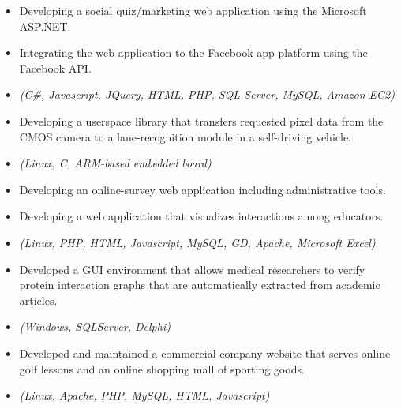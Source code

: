 \begin{itemize}
     \item{Developing a social quiz/marketing web application using the Microsoft ASP.NET.}
     \item{Integrating the web application to the Facebook app platform using the Facebook API.}
     \item{\it\small(C\#, Javascript, JQuery, HTML, PHP, SQL Server, MySQL, Amazon EC2)}
\end{itemize}

\begin{itemize}
 \item {Developing a userspace library that transfers requested pixel data from the CMOS camera
           to a lane-recognition module in a self-driving vehicle.}
 \item{\it\small(Linux, C, ARM-based embedded board)}
\end{itemize}

  \begin{itemize}
     \item{Developing an online-survey web application including administrative tools.}
     \item{Developing a web application that visualizes interactions among educators.}
     \item{\it\small(Linux, PHP, HTML, Javascript, MySQL, GD, Apache, Microsoft Excel)}
  \end{itemize}

\begin{itemize}
 \item {Developed a GUI environment that allows medical researchers to verify protein interaction graphs
          that are automatically extracted from academic articles.}
 \item{\it\small(Windows, SQLServer, Delphi)}
\end{itemize}

    
\begin{itemize}
 \item{Developed and maintained a commercial company website that 
          serves online golf lessons and an online shopping mall of sporting goods.}
 \item{\it\small(Linux, Apache, PHP, MySQL, HTML, Javascript)}
\end{itemize}
